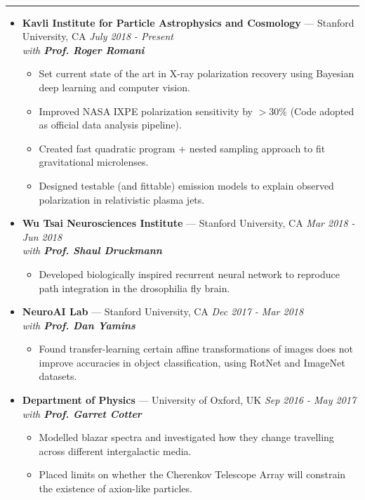 \documentclass[11 pt,oneside]{article}
\newenvironment{ressection}[1]{
	\vspace{4pt}
	{\selectfont\Large\color{Mycolor2}{\textbf{#1}}}
	\vspace{-6.5pt} \\
	\textcolor{Mycolor2}{\rule{\textwidth}{0.7pt}}
	\begin{itemize}
	\vspace{3pt}
}{
	\end{itemize}
}
\newcommand{\ressubitem}{
	\vspace{-4pt}
	\item
}
\newcommand{\resbigitem}[3]{
	\vspace{-5pt}
	\item[]
	\textbf{#1} --- #2 %
	\hfill
	\textit{#3}
}
\newenvironment{ressubsec}[3]{
	\resbigitem{#1}{#2}{#3}
	\vspace{-2pt}
	\begin{itemize}
}{
	\end{itemize}
}
\begin{document}
\begin{ressection}{\textbf{Research}}

	\vspace{2pt}
	\begin{ressubsec}{Kavli Institute for Particle Astrophysics and Cosmology}{Stanford University, CA}{July 2018 - Present \\ with \textbf{Prof. Roger Romani}}
		\ressubitem{Set current state of the art in X-ray polarization recovery using Bayesian deep learning and computer vision.}
		\ressubitem{Improved NASA IXPE polarization sensitivity by $>30\%$ (Code adopted as official data analysis pipeline).}
		\ressubitem{Created fast quadratic program + nested sampling approach to fit gravitational microlenses.}
		\ressubitem{Designed testable (and fittable) emission models to explain observed polarization in relativistic plasma jets.}
	\end{ressubsec}

	\vspace{2pt}
	\begin{ressubsec}{Wu Tsai Neurosciences Institute}{Stanford University, CA}{Mar 2018 - Jun 2018 \\ with \textbf{Prof. Shaul Druckmann}}
		\ressubitem{Developed biologically inspired recurrent neural network to reproduce path integration in the drosophilia fly brain.}
	\end{ressubsec}

	\vspace{2pt}
	\begin{ressubsec}{NeuroAI Lab}{Stanford University, CA}{Dec 2017 - Mar 2018 \\ with \textbf{Prof. Dan Yamins}}
		\ressubitem{Found transfer-learning certain affine transformations of images does not improve accuracies in object classification, using RotNet and ImageNet datasets.}

	\end{ressubsec}

	\vspace{2pt}
	\begin{ressubsec}{Department of Physics}{University of Oxford, UK}{Sep 2016 - May 2017 \\ with \textbf{Prof. Garret Cotter}}
		\ressubitem{Modelled blazar spectra and investigated how they change travelling across different intergalactic media.}
		\ressubitem{Placed limits on whether the Cherenkov Telescope Array will constrain the existence of axion-like particles.}
	\end{ressubsec}


\end{ressection}
\end{document}
